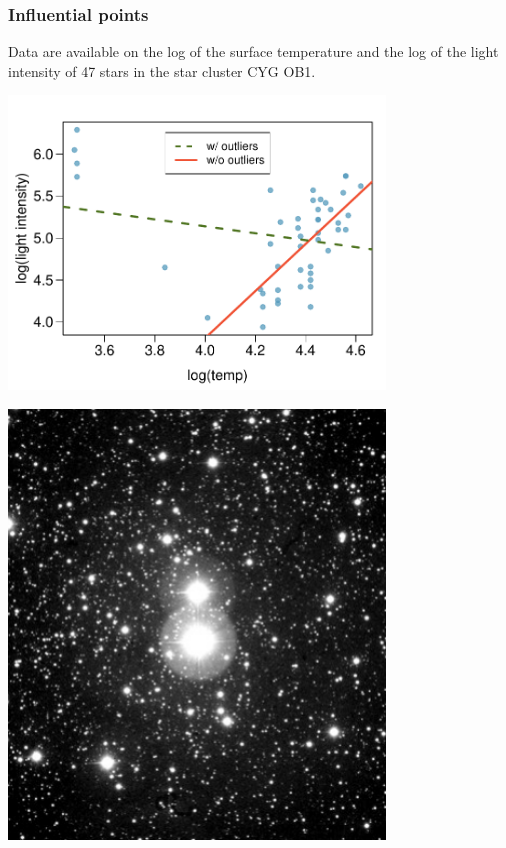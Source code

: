 \documentclass[notes,11pt, aspectratio=169]{beamer}
\begin{document}

\begin{frame}
\frametitle{Influential points}

Data are available on the log of the surface temperature and the log of the light intensity of 47 stars in the star cluster CYG OB1.

{
\begin{center}
\includegraphics[width=0.75\textwidth]{graphs/star}
\end{center}
}
{
\begin{center}
\includegraphics[width=0.75\textwidth]{graphs/cyg}
\end{center}
}

\end{frame}
\end{document}
